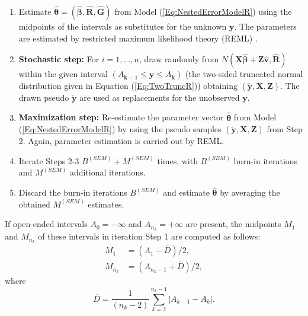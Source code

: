 \begin{enumerate}
\item Estimate \(\boldsymbol{\hat{\theta}}=\left(\boldsymbol{\widehat{\beta}},\mathbf{\widehat{R}},\mathbf{\widehat{G}}\right)\)  from Model (\ref{Eq:NestedErrorModelR}) using the midpoints of the intervals as substitutes for the unknown \(\mathbf{y}\). The parameters are estimated by restricted maximum likelihood theory (REML) \citep{Tho62}.

\item \textbf{Stochastic step:} For  \(i=1,\ldots , n\), draw randomly from \(N\left(\mathbf{X}\boldsymbol{\widehat{\beta}}+\mathbf{Z}\mathbf{\hat{v}}, \mathbf{\widehat{R}}\right)\) within the given interval \(\left(A_{\mathbf{k}-1} \leq \mathbf{y} \leq A_{\mathbf{k}}\right)\) (the two-sided truncated normal distribution given in Equation (\ref{Eq:TwoTruncR})) obtaining \(\left(\mathbf{\tilde{y}},\mathbf{X},\mathbf{Z}\right)\). The drawn pseudo \(\mathbf{\tilde{y}}\) are used as replacements for the unobserved \(\mathbf{y}\).

\item \textbf{Maximization step:} Re-estimate the parameter vector \(\boldsymbol{\hat{\theta}}\) from Model (\ref{Eq:NestedErrorModelR}) by using the pseudo samples \(\left(\mathbf{\tilde{y}},\mathbf{X},\mathbf{Z}\right)\) from Step 2. Again, parameter estimation is carried out by REML.

\item Iterate Steps 2-3 \(B^{(SEM)}+M^{(SEM)}\) times, with \(B^{(SEM)}\) burn-in iterations and \(M^{(SEM)}\)  additional iterations. 

\item Discard the burn-in iterations \(B^{(SEM)}\) and estimate \(\boldsymbol{\hat{\theta}}\) by averaging the obtained \(M^{(SEM)}\) estimates.

\end{enumerate} 
If open-ended intervals \(A_{0}=-\infty \) and \(A_{n_{k}}=+\infty \) are present, the midpoints \(M_{1}\) and \(M_{n_{k}}\) of these intervals in iteration Step 1 are computed as follows:
\begin{equation*}
\begin{split}
M_{1}&=\left(A_{1}-\overline{D}\right)/2, \\
M_{n_{k}}&=\left(A_{n_{k}-1}+\overline{D}\right)/2,
\end{split}
\end{equation*}
where
\begin{equation*}
\overline{D}=\frac{1}{\left(n_{k}-2\right)}\sum_{k=2}^{n_{k}-1}|A_{k-1}-A_{k}|.
\end{equation*}
